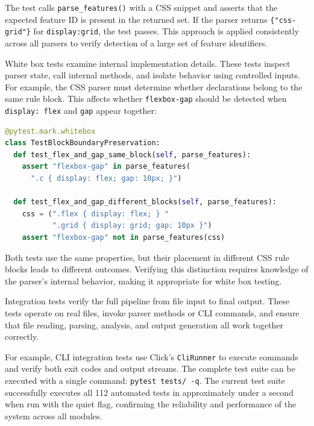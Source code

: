 The test calls \texttt{parse\_features()} with a CSS snippet and asserts that the expected feature ID is present in the returned set. If the parser returns \texttt{\{"css-grid"\}} for \texttt{display:grid}, the test passes. This approach is applied consistently across all parsers to verify detection of a large set of feature identifiers.

White box tests examine internal implementation details. These tests inspect parser state, call internal methods, and isolate behavior using controlled inputs. For example, the CSS parser must determine whether declarations belong to the same rule block. This affects whether \texttt{flexbox-gap} should be detected when \texttt{display: flex} and \texttt{gap} appear together:

\begin{lstlisting}[caption={White box test for block boundary preservation}, label=src:whitebox-test, language=Python, basicstyle=\ttfamily\footnotesize, breaklines=true]
@pytest.mark.whitebox
class TestBlockBoundaryPreservation:
  def test_flex_and_gap_same_block(self, parse_features):
    assert "flexbox-gap" in parse_features(
      ".c { display: flex; gap: 10px; }")

  def test_flex_and_gap_different_blocks(self, parse_features):
    css = (".flex { display: flex; } "
           ".grid { display: grid; gap: 10px }")
    assert "flexbox-gap" not in parse_features(css)
\end{lstlisting}

Both tests use the same properties, but their placement in different CSS rule blocks leads to different outcomes. Verifying this distinction requires knowledge of the parser's internal behavior, making it appropriate for white box testing.

Integration tests verify the full pipeline from file input to final output. These tests operate on real files, invoke parser methods or CLI commands, and ensure that file reading, parsing, analysis, and output generation all work together correctly.

For example, CLI integration tests use Click's \texttt{CliRunner} to execute commands and verify both exit codes and output streams. The complete test suite can be executed with a single command: \texttt{pytest tests/ -q}. The current test suite successfully executes all 112 automated tests in approximately under a second when run with the quiet flag, confirming the reliability and performance of the system across all modules.

